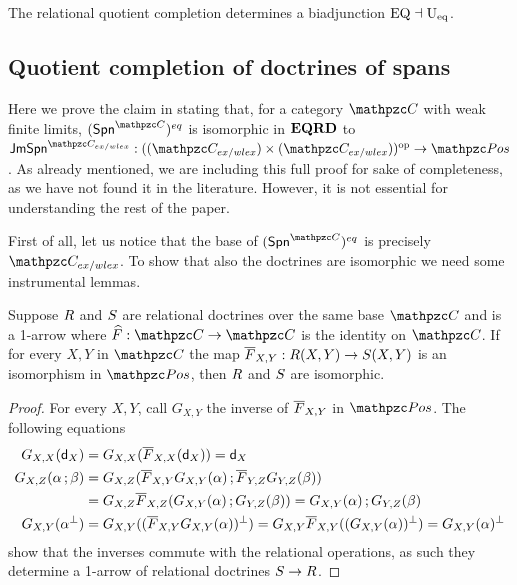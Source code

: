 \begin{proposition}\label{prop:eqc-mnd}The relational quotient completion determines a biadjunction $\mathrm{EQ}\dashv\mathrm{U_{eq}}$. 
\end{proposition}


\subsection{Quotient completion of doctrines of spans}\label{ss:spans}

Here we prove the claim in  stating that, for a category $\CC$ with weak finite limits, $\EQR{\Span\CC}$ is isomorphic in $\mathbf{EQRD}$ to $\fun{\jmSpan{\CC_{ex/wlex}}}{\bop{(\CC_{ex/wlex})}}{\Pos}$. 
As already mentioned, we are including this full proof for sake of completeness, as we have not found it in the literature. 
However, it is not essential for understanding the rest of the paper.



First of all, let us notice that 
the base of $\EQR{\Span\CC}$ is precisely $\CC_{ex/wlex}$. 
To show that also the doctrines are isomorphic we  need some instrumental lemmas.

\begin{lemma}\label{l:isofrecce}
Suppose $R$ and $S$ are relational doctrines over the same base $\CC$ and  is a 1-arrow where $\fun{\fn{F}}{\CC}{\CC}$ is the identity on $\CC$. If for every $X,Y$ in $\CC$ the map $\fun{\lift{F}_{X,Y}}{\RDoc(X,Y)}{\SDoc(X,Y)}$ is an isomorphism in $\Pos$, then $R$ and $S$ are isomorphic.
\end{lemma}
\begin{proof}For every $X,Y$, call $G_{X,Y}$ the inverse of $\overline{F}_{X,Y}$ in $\Pos$.  The following equations 
\begin{align*} 
G_{X,X}(\mathsf{d}_X)&=G_{X,X}(\overline{F}_{X,X}(\mathsf{d}_X))=\mathsf{d}_X\\
G_{X,Z}(\alpha\mathop{\mathbf{;}}\beta)&=G_{X,Z}(\overline{F}_{X,Y}G_{X,Y}(\alpha)\mathop{\mathbf{;}} \overline{F}_{Y,Z}G_{Y,Z}(\beta))\\
&=G_{X,Z}\overline{F}_{X,Z}(G_{X,Y}(\alpha)\mathop{\mathbf{;}} G_{Y,Z}(\beta))=G_{X,Y}(\alpha)\mathop{\mathbf{;}} G_{Y,Z}(\beta)\\
G_{X,Y}(\alpha^{\bot})&= G_{X,Y}((\overline{F}_{X,Y}G_{X,Y}(\alpha))^{\bot})=G_{X,Y}\overline{F}_{X,Y}((G_{X,Y}(\alpha))^{\bot})=G_{X,Y}(\alpha)^{\bot}
\end{align*} 
 show that the inverses commute with the relational operations, as such they determine a 1-arrow of relational doctrines $\fun{}{\SDoc}{\RDoc}$.
\end{proof}

